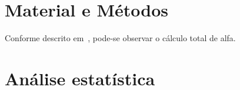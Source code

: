 \documentclass[a4paper, brazil, 12pt , onecolumn]{report}
\begin{document}
\chapter{Material e Métodos}\label{sec:mat}
\lipsum[3-8]
\lstset{language=Python}


Conforme descrito em~\cite{Harris2012,Hennessy2014,Goodfellow2016,Mota2011}, pode-se observar o cálculo total de alfa.

\printindex
\appendix
\chapter{Análise estatística}
\lipsum[3-5]


\end{document}

